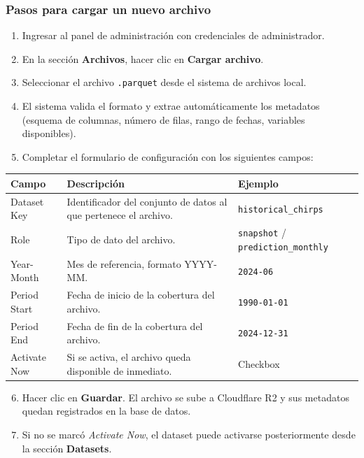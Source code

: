 \subsubsection{Pasos para cargar un nuevo archivo}

\begin{enumerate}
    \item Ingresar al panel de administración con credenciales de administrador.
    \item En la sección \textbf{Archivos}, hacer clic en \textbf{Cargar archivo}.
    \item Seleccionar el archivo \texttt{.parquet} desde el sistema de archivos local.
    \item El sistema valida el formato y extrae automáticamente los metadatos (esquema de columnas, número de filas, rango de fechas, variables disponibles).
    \item Completar el formulario de configuración con los siguientes campos:
\end{enumerate}

\begin{center}
\small
\begin{tabular}{@{}lp{4.8cm}l@{}}
\toprule
\textbf{Campo} & \textbf{Descripción} & \textbf{Ejemplo} \\
\midrule
Dataset Key  & Identificador del conjunto de datos al que pertenece el archivo. & \texttt{historical\_chirps} \\
Role         & Tipo de dato del archivo. & \texttt{snapshot} / \texttt{prediction\_monthly} \\
Year-Month   & Mes de referencia, formato YYYY-MM. & \texttt{2024-06} \\
Period Start & Fecha de inicio de la cobertura del archivo. & \texttt{1990-01-01} \\
Period End   & Fecha de fin de la cobertura del archivo. & \texttt{2024-12-31} \\
Activate Now & Si se activa, el archivo queda disponible de inmediato. & Checkbox \\
\bottomrule
\end{tabular}
\end{center}

\begin{enumerate}
\setcounter{enumi}{5}
    \item Hacer clic en \textbf{Guardar}. El archivo se sube a Cloudflare R2 y sus metadatos quedan registrados en la base de datos.
    \item Si no se marcó \textit{Activate Now}, el dataset puede activarse posteriormente desde la sección \textbf{Datasets}.
\end{enumerate}

